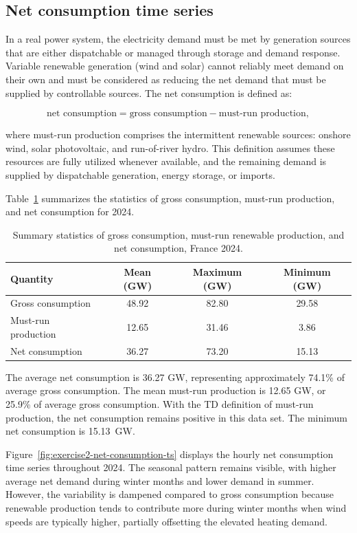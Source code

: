 \documentclass[a4paper]{report}
\begin{document}
\subsection{Net consumption time series}

In a real power system, the electricity demand must be met by generation sources that are either dispatchable or managed through storage and demand response. Variable renewable generation (wind and solar) cannot reliably meet demand on their own and must be considered as reducing the net demand that must be supplied by controllable sources. The net consumption is defined as:

\[
\text{net consumption} = \text{gross consumption} - \text{must-run production},
\]

where must-run production comprises the intermittent renewable sources: onshore wind, solar photovoltaic, and run-of-river hydro. This definition assumes these resources are fully utilized whenever available, and the remaining demand is supplied by dispatchable generation, energy storage, or imports.

Table~\ref{tab:exercise2-net-consumption} summarizes the statistics of gross consumption, must-run production, and net consumption for 2024.

\begin{table}[H]
  \centering
  \caption{Summary statistics of gross consumption, must-run renewable production, and net consumption, France 2024.}
  \label{tab:exercise2-net-consumption}
  \begin{tabular}{lccc}
    \toprule
    Quantity & Mean (GW) & Maximum (GW) & Minimum (GW) \\
    \midrule
    Gross consumption & 48.92 & 82.80 & 29.58 \\
    Must-run production & 12.65 & 31.46 & 3.86 \\
    Net consumption & 36.27 & 73.20 & 15.13 \\
    \bottomrule
  \end{tabular}
\end{table}

The average net consumption is 36.27 GW, representing approximately 74.1\% of average gross consumption. The mean must-run production is 12.65 GW, or 25.9\% of average gross consumption. With the TD definition of must-run production, the net consumption remains positive in this data set. The minimum net consumption is \SI{15.13}{\giga\watt}.

Figure~\ref{fig:exercise2-net-consumption-ts} displays the hourly net consumption time series throughout 2024. The seasonal pattern remains visible, with higher average net demand during winter months and lower demand in summer. However, the variability is dampened compared to gross consumption because renewable production tends to contribute more during winter months when wind speeds are typically higher, partially offsetting the elevated heating demand.
\end{document}
